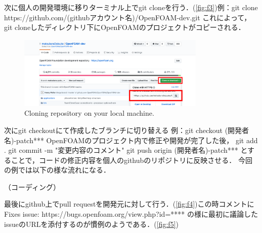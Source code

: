 \documentclass{ltjoc}
\begin{document}
次に個人の開発環境に移りターミナル上でgit cloneを行う．(\autoref{fig:f3})例：git clone https://github.com/(githubアカウント名)/OpenFOAM-dev.git
これによって，git cloneしたディレクトリ下にOpenFOAMのプロジェクトがコピーされる．
\begin{figure}[htbp]
\centering
\includegraphics[width=0.8\textwidth]{fig/fig-f3.png}
\caption{Cloning repository on your local machine.}
\label{fig:f3}
\end{figure}

次にgit checkoutにて作成したブランチに切り替える 例：git checkout (開発者名)-patch***
OpenFOAMのプロジェクト内で修正や開発が完了した後，
git add . git commit -m "変更内容のコメント" git push origin (開発者名)-patch***
とすることで，コードの修正内容を個人のgithubのリポジトリに反映させる．
今回の例では以下の様な流れになる．

\begin{shbox}
\end{shbox}

（コーディング）

\begin{shbox}
\end{shbox}



最後にgithub上でpull requestを開発元に対して行う．(\autoref{fig:f4})この時コメントに
Fixes issue:
https://bugs.openfoam.org/view.php?id=****
の様に最初に議論したissueのURLを添付するのが慣例のようである．(\autoref{fig:f5})
\end{document}
